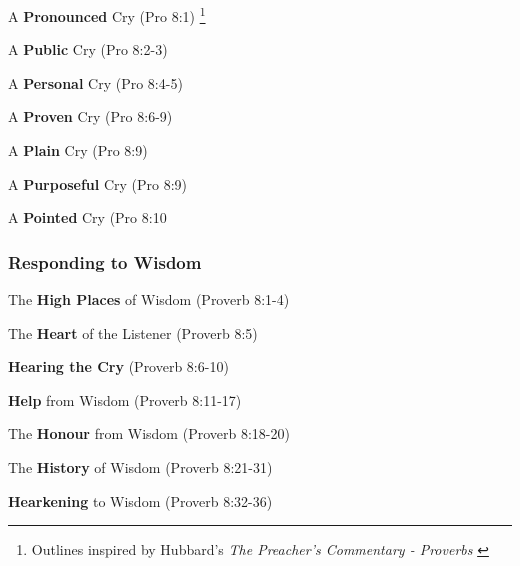 \begin{compactenum}[I.][8] 
     \item A \textbf{Pronounced} Cry  (Pro 8:1) \footnote{Outlines inspired by Hubbard's \emph{The Preacher's Commentary - Proverbs} \cite{hubbard2004preacher}}
     \item A \textbf{Public} Cry  (Pro 8:2-3) 
     \item A \textbf{Personal} Cry  (Pro 8:4-5) 
     \item A \textbf{Proven} Cry  (Pro 8:6-9) 
     \item A \textbf{Plain} Cry  (Pro 8:9) 
     \item A \textbf{Purposeful} Cry  (Pro 8:9) 
     \item A \textbf{Pointed} Cry  (Pro 8:10
\end{compactenum} 


\subsubsection{Responding to Wisdom}

\begin{compactenum}
    \item The \textbf{High Places} of Wisdom (Proverb 8:1-4)
    \item The \textbf{Heart} of the Listener (Proverb 8:5)
    \item \textbf{Hearing the Cry} (Proverb 8:6-10)
    \item \textbf{Help} from Wisdom (Proverb 8:11-17)
    \item The \textbf{Honour} from Wisdom (Proverb 8:18-20)
    \item The \textbf{History} of Wisdom (Proverb 8:21-31)
    \item \textbf{Hearkening} to Wisdom (Proverb 8:32-36)
\end{compactenum}


